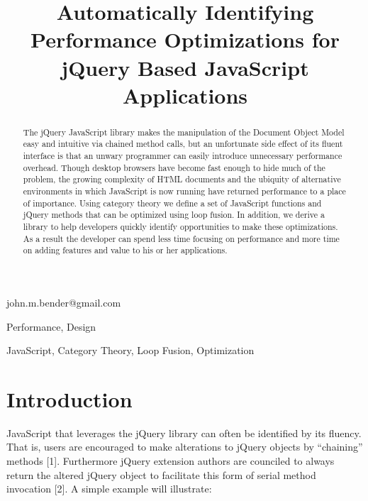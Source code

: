 \documentclass[preprint]{sigplanconf}
\begin{document}
\copyrightdata{[to be supplied]}


\title{Automatically Identifying Performance Optimizations for jQuery Based JavaScript Applications}

           {}
           {john.m.bender@gmail.com}
\maketitle

\begin{abstract}
The jQuery JavaScript library makes the manipulation of the Document Object Model easy and intuitive via chained method calls, but an unfortunate side effect of its fluent interface is that an unwary programmer can easily introduce unnecessary performance overhead. Though desktop browsers have become fast enough to hide much of the problem, the growing complexity of HTML documents and the ubiquity of alternative environments in which JavaScript is now running have returned performance to a place of importance. Using category theory we define a set of JavaScript functions and jQuery methods that can be optimized using loop fusion. In addition, we derive a library to help developers quickly identify opportunities to make these optimizations. As a result the developer can spend less time focusing on performance and more time on adding features and value to his or her applications.
\end{abstract}


\terms
Performance, Design

\keywords
JavaScript, Category Theory, Loop Fusion, Optimization

\section{Introduction}

JavaScript that leverages the jQuery library can often be identified by its fluency. That is, users are encouraged to make alterations to jQuery objects by ``chaining'' methods [1]. Furthermore jQuery extension authors are counciled to always return the altered jQuery object to facilitate this form of serial method invocation [2]. A simple example will illustrate:
\end{document}
